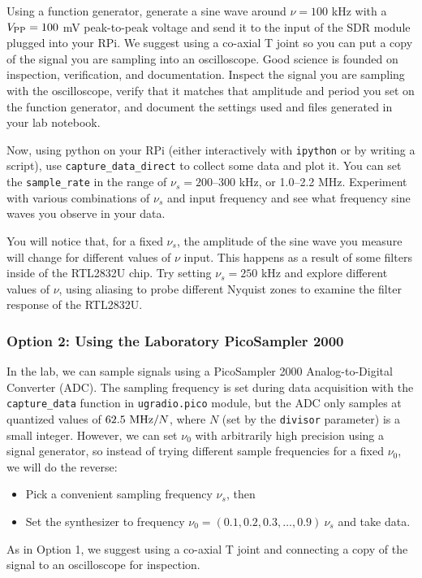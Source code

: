 \documentclass[11pt,preprint]{aastex}
\begin{document}
Using a function generator, generate a sine wave around $\nu=100$ kHz with a 
$V_{\rm PP}=100$ mV peak-to-peak
voltage and send it to the input of the SDR module plugged into your RPi.
We suggest using a co-axial T joint so
you can put a copy of the signal you are sampling into an oscilloscope.
Good science is founded on inspection, verification, and documentation. 
Inspect the signal you are sampling with the oscilloscope, verify that it matches that amplitude
and period you set on the function generator, and document the settings used and files generated
in your lab notebook.

Now, using python on your RPi (either interactively with {\tt ipython} or by writing
a script), use {\tt capture\_data\_direct} to collect some data and plot it.
You can set the {\tt sample\_rate} in the range of $\nu_s=200$--300 kHz, or 1.0--2.2 MHz. Experiment
with various combinations of $\nu_s$ and input frequency and see what frequency
sine waves you observe in your data.

You will notice that, for a fixed $\nu_s$, the amplitude
of the sine wave you measure will change for different values of $\nu$ input. This
happens as a result of some filters inside of the RTL2832U chip. Try setting $\nu_s=250$ kHz
and explore different values of $\nu$, using aliasing to probe different Nyquist zones to
examine the filter response of the RTL2832U.

\subsubsection{Option 2: Using the Laboratory PicoSampler 2000}

\noindent
In the lab, we can sample signals using a PicoSampler 2000 Analog-to-Digital Converter (ADC).
The sampling frequency is set during data acquisition with the {\tt capture\_data} function
in {\tt ugradio.pico} module, but the ADC only samples at
quantized values of $62.5~{\rm MHz} / N$, where $N$ (set by the {\tt divisor} parameter)
is a small integer. However, we can set
$\nu_0$ with arbitrarily high precision using a signal generator, so instead of trying
different sample frequencies for a fixed $\nu_0$, we will do the reverse:
\begin{itemize} 
	\item Pick a convenient sampling frequency $\nu_s$, then
	\item Set the synthesizer to frequency $\nu_0 = (0.1, 0.2,
	  0.3, \dots, 0.9)~\nu_s$ and take data.
\end{itemize}
\noindent As in Option 1, we suggest using a co-axial T joint and
connecting a copy of the signal to an oscilloscope for inspection.
\end{document}
